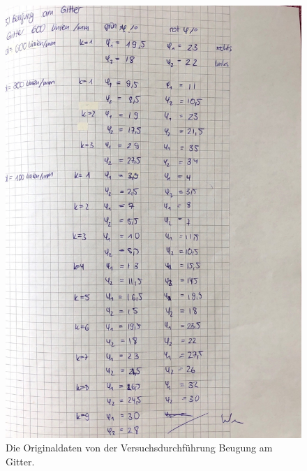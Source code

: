 \begin{figure}
    \centering
    \includegraphics[width=\textwidth]{bilder/Data2_v400.pdf}
    \caption{Die Originaldaten von der Versuchsdurchführung Beugung am Gitter.}
    \label{fig:originaldaten2}
\end{figure}